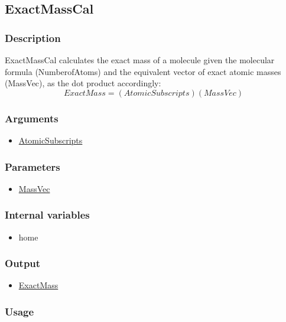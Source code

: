 \subsection{ExactMassCal}\label{ExactMassCal}
\subsubsection{Description}
ExactMassCal calculates the exact mass of a molecule given the molecular formula (NumberofAtoms) and the equivalent vector of exact atomic masses (MassVec), as the dot product accordingly:
\begin{equation}
ExactMass=\left(AtomicSubscripts\right)\left(MassVec\right)
\end{equation}

\subsubsection{Arguments}
\begin{itemize}
\item \hyperref[AtomicSubscripts]{AtomicSubscripts}
\end{itemize}

\subsubsection{Parameters}
\begin{itemize}
\item \hyperref[MassVec]{MassVec}
\end{itemize}
\subsubsection{Internal variables}
\begin{itemize}
\item home
\end{itemize}
\subsubsection{Output}
\begin{itemize}
\item \hyperref[ExactMass]{ExactMass}
\end{itemize}

\subsubsection{Usage}




